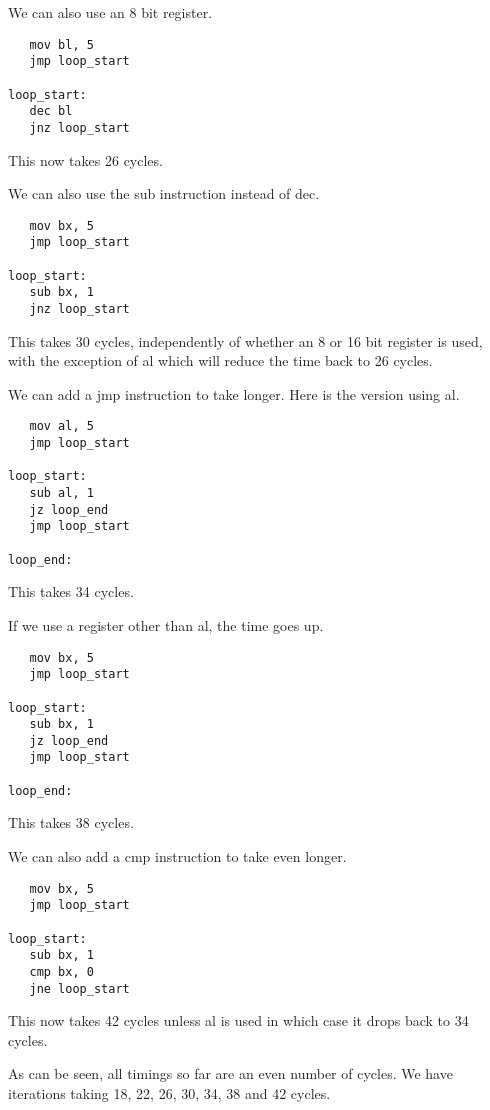\documentclass[a4paper,10pt]{amsart}
\begin{document}
We can also use an 8 bit register.

\begin{lstlisting}
   mov bl, 5
   jmp loop_start

loop_start:
   dec bl
   jnz loop_start
\end{lstlisting}

This now takes 26 cycles.

We can also use the sub instruction instead of dec.

\begin{lstlisting}
   mov bx, 5
   jmp loop_start

loop_start:
   sub bx, 1
   jnz loop_start
\end{lstlisting}

This takes 30 cycles, independently of whether an 8 or 16 bit register is used,
with the exception of al which will reduce the time back to 26 cycles.

We can add a jmp instruction to take longer. Here is the version using al.

\begin{lstlisting}
   mov al, 5
   jmp loop_start

loop_start:
   sub al, 1
   jz loop_end
   jmp loop_start

loop_end:
\end{lstlisting}

This takes 34 cycles.

If we use a register other than al, the time goes up.

\begin{lstlisting}
   mov bx, 5
   jmp loop_start

loop_start:
   sub bx, 1
   jz loop_end
   jmp loop_start

loop_end:
\end{lstlisting}

This takes 38 cycles.

We can also add a cmp instruction to take even longer.

\begin{lstlisting}
   mov bx, 5
   jmp loop_start

loop_start:
   sub bx, 1
   cmp bx, 0
   jne loop_start
\end{lstlisting}

This now takes 42 cycles unless al is used in which case it drops back to 34
cycles.

As can be seen, all timings so far are an even number of cycles. We have
iterations taking 18, 22, 26, 30, 34, 38 and 42 cycles.
\end{document}
